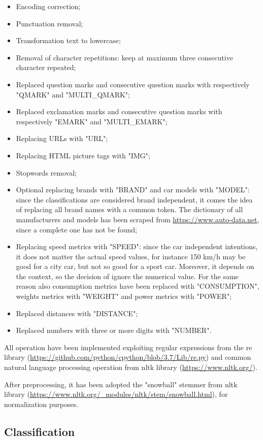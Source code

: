 \begin{itemize}
	\item Encoding correction;
	\item Punctuation removal;
	\item Transformation text to lowercase;
	\item Removal of character repetitions: keep at maximum three consecutive character repeated;
	\item Replaced question marks and consecutive question marks with respectively "QMARK" and "MULTI\_QMARK";
	\item Replaced exclamation marks and consecutive question marks with respectively "EMARK" and "MULTI\_EMARK";
	\item Replacing URLs with "URL";
	\item Replacing HTML picture tags with "IMG";
	\item Stopwords removal;
	\item Optional replacing brands with "BRAND" and car models with "MODEL": since the classifications are considered brand independent, it comes the idea of replacing all brand names with a common token. The dictionary of all manufacturers and models has been scraped from \url{https://www.auto-data.net}, since a complete one has not be found;
	\item Replacing speed metrics with "SPEED": since the car independent intentions, it does not matter the actual speed values, for instance 150 km/h may be good for a city car, but not so good for a sport car. Moreover, it depends on the context, so the decision of ignore the numerical value. For the same reason also consumption metrics have been replaced with "CONSUMPTION", weights metrics with "WEIGHT" and power metrics with "POWER";
	\item Replaced distances with "DISTANCE";
	\item Replaced numbers with three or more digits with "NUMBER".
\end{itemize}

All operation have been implemented exploiting regular expressions from the re library (\url{https://github.com/python/cpython/blob/3.7/Lib/re.py}) and common natural language processing operation from nltk library (\url{https://www.nltk.org/}).

After preprocessing, it has been adopted the "snowball" stemmer from nltk library (\url{https://www.nltk.org/_modules/nltk/stem/snowball.html}), for normalization purposes.


\subsection{Classification}


